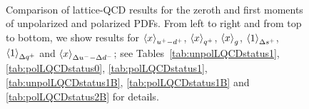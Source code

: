 \begin{figure}[!p]
\begin{center}
{\ \ 
}
\end{center}
\caption{\small Comparison of lattice-QCD results for
  the zeroth and first moments
  of unpolarized and polarized PDFs.
  From left to right and from top to bottom, we show
  results for $\left\langle x\right\rangle_{u^+-d^+}$, $\left\langle x\right\rangle_{q^+}$, $\left\langle x\right\rangle_{g}$,
  $\left\langle 1 \right\rangle_{\Delta s^+}$, $\left\langle 1\right\rangle_{\Delta q^+}$ and
  $\left\langle x\right\rangle_{\Delta u^- - \Delta d^-}$;
  see Tables~\ref{tab:unpolLQCDstatus1}, \ref{tab:polLQCDstatus0},
  \ref{tab:polLQCDstatus1}, \ref{tab:unpolLQCDstatus1B},
  \ref{tab:polLQCDstatus1B} and \ref{tab:polLQCDstatus2B}
  for details.
}
\label{fig:latt_res}
\end{figure}






